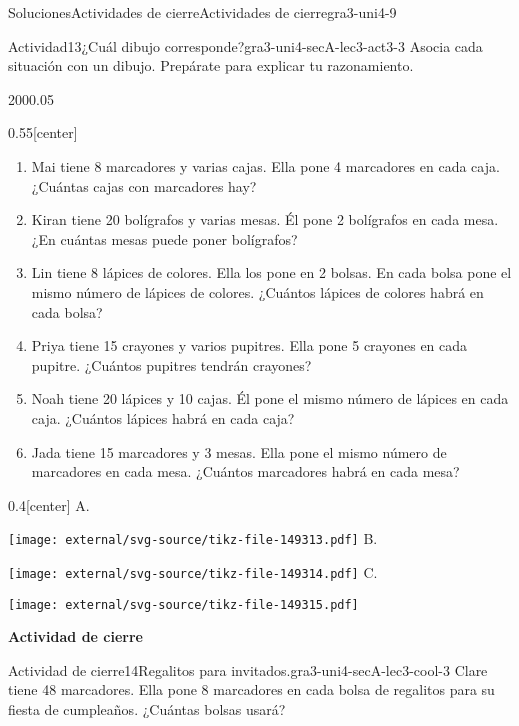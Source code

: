 \documentclass[twoside,10pt,]{article}
\begin{document}
\begin{solutions-section}{Soluciones}{Actividades de cierre}{}{Actividades de cierre}{}{}{gra3-uni4-9}
\begin{activitysolution}{Actividad}{13}{¿Cuál dibujo corresponde?}{gra3-uni4-secA-lec3-act3-3}%
Asocia cada situación con un dibujo. Prepárate para explicar tu razonamiento.%
\begin{sidebyside}{2}{0}{0}{0.05}%
\begin{sbspanel}{0.55}[center]%
%
\begin{enumerate}
\item{}Mai tiene 8 marcadores y varias cajas. Ella pone 4 marcadores en cada caja. ¿Cuántas cajas con marcadores hay?%
\item{}Kiran tiene 20 bolígrafos y varias mesas. Él pone 2 bolígrafos en cada mesa. ¿En cuántas mesas puede poner bolígrafos?%
\item{}Lin tiene 8 lápices de colores. Ella los pone en 2 bolsas. En cada bolsa pone el mismo número de lápices de colores. ¿Cuántos lápices de colores habrá en cada bolsa?%
\item{}Priya tiene 15 crayones y varios pupitres. Ella pone 5 crayones en cada pupitre. ¿Cuántos pupitres tendrán crayones?%
\item{}Noah tiene 20 lápices y 10 cajas. Él pone el mismo número de lápices en cada caja. ¿Cuántos lápices habrá en cada caja?%
\item{}Jada tiene 15 marcadores y 3 mesas. Ella pone el mismo número de marcadores en cada mesa. ¿Cuántos marcadores habrá en cada mesa?%
\end{enumerate}
\end{sbspanel}%
\begin{sbspanel}{0.4}[center]%
A.%
\par
\texttt{[image: external/svg-source/tikz-file-149313.pdf]}
B.%
\par
\texttt{[image: external/svg-source/tikz-file-149314.pdf]}
C.%
\par
\texttt{[image: external/svg-source/tikz-file-149315.pdf]}
\end{sbspanel}%
\end{sidebyside}%
\end{activitysolution}%
\par\medskip
\noindent\textbf{\large{}\space\textperiodcentered\space{}Actividad de cierre}
\begin{projectsolution}{Actividad de cierre}{14}{Regalitos para invitados.}{gra3-uni4-secA-lec3-cool-3}%
Clare tiene 48 marcadores. Ella pone 8 marcadores en cada bolsa de regalitos para su fiesta de cumpleaños. ¿Cuántas bolsas usará?%

\end{projectsolution}
\end{solutions-section}
\end{document}
